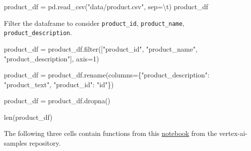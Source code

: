 \documentclass[
  letterpaper,
  DIV=11,
  numbers=noendperiod]{scrreprt}
\newenvironment{Shaded}{\begin{snugshade}}{\end{snugshade}}
\newcommand{\BuiltInTok}[1]{\textcolor[rgb]{0.00,0.23,0.31}{#1}}
\newcommand{\CharTok}[1]{\textcolor[rgb]{0.13,0.47,0.30}{#1}}
\newcommand{\DecValTok}[1]{\textcolor[rgb]{0.68,0.00,0.00}{#1}}
\newcommand{\NormalTok}[1]{\textcolor[rgb]{0.00,0.23,0.31}{#1}}
\newcommand{\OperatorTok}[1]{\textcolor[rgb]{0.37,0.37,0.37}{#1}}
\newcommand{\StringTok}[1]{\textcolor[rgb]{0.13,0.47,0.30}{#1}}
\begin{document}
\begin{Shaded}
\begin{Highlighting}[]
\NormalTok{product\_df }\OperatorTok{=}\NormalTok{ pd.read\_csv(}\StringTok{"data/product.csv"}\NormalTok{, sep}\OperatorTok{=}\StringTok{\textquotesingle{}}\CharTok{\textbackslash{}t}\StringTok{\textquotesingle{}}\NormalTok{)}
\NormalTok{product\_df}
\end{Highlighting}
\end{Shaded}

Filter the dataframe to consider \texttt{product\_id},
\texttt{product\_name}, \texttt{product\_description}.

\begin{Shaded}
\begin{Highlighting}[]
\NormalTok{product\_df }\OperatorTok{=}\NormalTok{ product\_df.}\BuiltInTok{filter}\NormalTok{([}\StringTok{"product\_id"}\NormalTok{, }\StringTok{"product\_name"}\NormalTok{, }\StringTok{"product\_description"}\NormalTok{], axis}\OperatorTok{=}\DecValTok{1}\NormalTok{)}
\end{Highlighting}
\end{Shaded}

\begin{Shaded}
\begin{Highlighting}[]
\NormalTok{product\_df }\OperatorTok{=}\NormalTok{ product\_df.rename(columns}\OperatorTok{=}\NormalTok{\{}\StringTok{"product\_description"}\NormalTok{: }\StringTok{"product\_text"}\NormalTok{, }\StringTok{"product\_id"}\NormalTok{: }\StringTok{"id"}\NormalTok{\})}
\end{Highlighting}
\end{Shaded}

\begin{Shaded}
\begin{Highlighting}[]
\NormalTok{product\_df }\OperatorTok{=}\NormalTok{ product\_df.dropna()}
\end{Highlighting}
\end{Shaded}

\begin{Shaded}
\begin{Highlighting}[]
\BuiltInTok{len}\NormalTok{(product\_df)}
\end{Highlighting}
\end{Shaded}

The following three cells contain functions from this
\href{https://github.com/GoogleCloudPlatform/vertex-ai-samples/blob/main/notebooks/official/matching_engine/sdk_matching_engine_create_stack_overflow_embeddings_vertex.ipynb}{notebook}
from the vertex-ai-samples repository.
\end{document}
